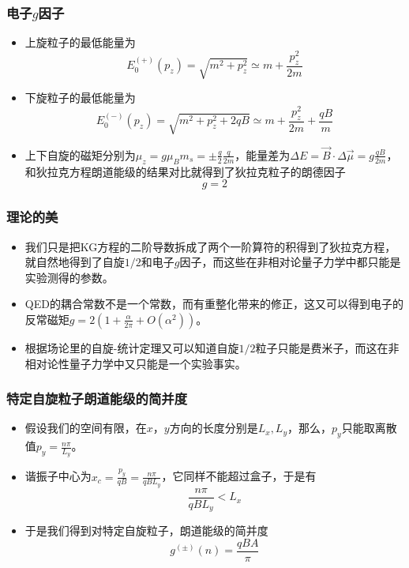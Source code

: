 \documentclass[aspectratio=1610,14pt,matheuler]{beamer}
\newcommand{\bch}{}
\newcommand{\ech}{}
\begin{document}
\begin{frame}
\frametitle{\bch 电子$g$因子 \ech}
\bch
\begin{itemize}
\item
上旋粒子的最低能量为$$E^{(+)}_0(p_z) = \sqrt{m^2 + p_z^2} \simeq m+ \frac{p_z^2}{2m}$$
\item
下旋粒子的最低能量为$$E^{(-)}_0(p_z) = \sqrt{m^2 + p_z^2 + 2qB} \simeq m+ \frac{p_z^2}{2m} + \frac{qB}{m}$$
\item
上下自旋的磁矩分别为$\mu_z = g \mu_B m_s = \pm \frac{g}{2} \frac{q}{2m}$，能量差为$\Delta E = \vec B \cdot \Delta \vec \mu = g \frac{qB}{2m}$，和狄拉克方程朗道能级的结果对比就得到了狄拉克粒子的朗德因子$$g=2$$
\end{itemize}
\ech
\end{frame}

\begin{frame}
\frametitle{\bch 理论的美 \ech}
\bch
\begin{itemize}
\item
我们只是把KG方程的二阶导数拆成了两个一阶算符的积得到了狄拉克方程，就自然地得到了自旋$1/2$和电子$g$因子，而这些在非相对论量子力学中都只能是实验测得的参数。
\item
QED的耦合常数不是一个常数，而有重整化带来的修正，这又可以得到电子的反常磁矩$g = 2\left(1 + \frac{\alpha}{2\pi} + O(\alpha^2)\right)$。
\item
根据场论里的自旋-统计定理又可以知道自旋$1/2$粒子只能是费米子，而这在非相对论性量子力学中又只能是一个实验事实。
\end{itemize}
\ech
\end{frame}

\begin{frame}
\frametitle{\bch 特定自旋粒子朗道能级的简并度 \ech}
\bch
\begin{itemize}
\item
假设我们的空间有限，在$x$，$y$方向的长度分别是$L_x,L_y$，那么，$p_y$只能取离散值$p_y = \frac{n\pi}{L_y}$。
\item
谐振子中心为$x_c = \frac{p_y}{qB} = \frac{n\pi}{qB L_y}$，它同样不能超过盒子，于是有
$$
\frac{n\pi}{qB L_y} < L_x
$$
\item
于是我们得到对特定自旋粒子，朗道能级的简并度
$$
g^{(\pm)}(n) = \frac{qBA}{\pi}
$$
\end{itemize}
\ech
\end{frame}
\end{document}
